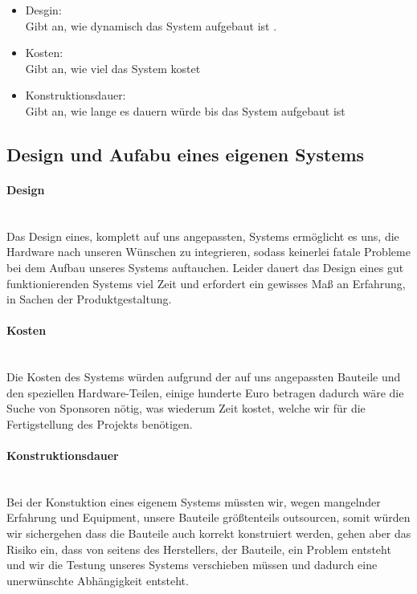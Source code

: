 \documentclass[11pt]{article}
\begin{document}
\begin{itemize}
	\item Desgin: \\Gibt an, wie dynamisch das System aufgebaut ist .
	\item Kosten: \\Gibt an, wie viel das System kostet
	\item Konstruktionsdauer: \\Gibt an, wie lange es dauern w\"urde bis das System aufgebaut ist
\end{itemize}

\subsection{Design und Aufabu eines eigenen Systems}

\paragraph{Design} \mbox{}\\
Das Design eines, komplett auf uns angepassten, Systems erm\"oglicht es uns, die Hardware nach unseren W\"unschen zu integrieren, sodass keinerlei fatale Probleme bei dem Aufbau unseres Systems auftauchen. Leider dauert das Design eines gut funktionierenden Systems viel Zeit und erfordert ein gewisses Ma{\ss} an Erfahrung, in Sachen der Produktgestaltung.

\paragraph{Kosten} \mbox{}\\
Die Kosten des Systems w\"urden aufgrund der auf uns angepassten Bauteile und den speziellen Hardware-Teilen, einige hunderte Euro betragen dadurch w\"are die Suche von Sponsoren n\"otig, was wiederum Zeit kostet, welche wir f\"ur die Fertigstellung des Projekts ben\"otigen.

\paragraph{Konstruktionsdauer} \mbox{}\\
Bei der Konstuktion eines eigenem Systems m\"ussten wir, wegen mangelnder Erfahrung und Equipment, unsere Bauteile gr\"o{\ss}tenteils outsourcen, somit w\"urden wir sichergehen dass die Bauteile auch korrekt konstruiert werden, gehen aber das Risiko ein, dass von seitens des Herstellers, der Bauteile, ein Problem entsteht und wir die Testung unseres Systems verschieben m\"ussen und dadurch eine unerw\"unschte Abh\"angigkeit entsteht.
\end{document}
